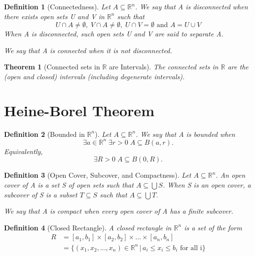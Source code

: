 \documentclass[11pt, oneside]{book}
\theoremstyle{break}
\newtheorem{thm}{Theorem}[section]
\newtheorem{defn}{Definition}[section]
\newcommand{\bb}[1]{\mathbb{#1}}			%
\begin{document}
\begin{defn}[Connectedness]
	Let $A \subseteq \bb{R}^n$. We say that A is disconnected when there exists open sets U and V in $\bb{R}^n$ such that
	\begin{equation*}
		U \cap A \neq \emptyset, \; V \cap A \neq \emptyset, \; U \cap V = \emptyset \text{ and } A = U \cup V
	\end{equation*}
	When A is disconnected, such open sets U and V are said to separate A.

	We say that A is connected when it is not disconnected.
\end{defn}

\begin{thm}[Connected sets in $\bb{R}$ are Intervals]
	The connected sets in $\bb{R}$ are the (open and closed) intervals (including degenerate intervals).
\end{thm}


\section{Heine-Borel Theorem}

\begin{defn}[Bounded in $\bb{R}^n$]
	Let $A \subseteq \bb{R}^n$. We say that A is bounded when
	\begin{equation*}
		\exists a \in \bb{R}^n \; \exists r > 0 \; A \subseteq B(a, r).
 	\end{equation*}
 	Equivalently,
 	\begin{equation*}
 		\exists R > 0 \; A \subseteq B(0, R).
 	\end{equation*}
\end{defn}

\begin{defn}[Open Cover, Subcover, and Compactness]
	Let $A \subseteq \bb{R}^n$. An open cover of A is a set S of open sets such that $A \subseteq \bigcup S$. When S is an open cover, a subcover of S is a subset $T \subseteq S$ such that $A \subseteq \bigcup T$.

	We say that A is compact when every open cover of A has a finite subcover.
\end{defn}

\begin{defn}[Closed Rectangle]
	A closed rectangle in $\bb{R}^n$ is a set of the form
	\begin{align*}
		R &= [a_1, b_1] \times [a_2, b_2] \times \hdots \times [a_n, b_n] \\
		  &= \{(x_1, x_2, ..., x_n) \in \bb{R}^n \, | \, a_i \leq x_i \leq b_i \text{ for all i}\}
	\end{align*}
\end{defn}
\end{document}
